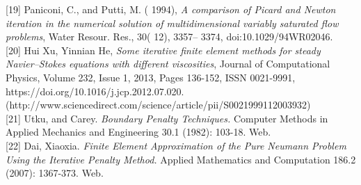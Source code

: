 \documentclass[11pt,twoside,a4paper]{article}
\begin{document}
[19] Paniconi, C., and Putti, M. ( 1994), \textit{A comparison of Picard and Newton iteration in the numerical solution of multidimensional variably saturated flow problems}, Water Resour. Res., 30( 12), 3357– 3374, doi:10.1029/94WR02046.\\

[20] Hui Xu, Yinnian He,
\textit{Some iterative finite element methods for steady Navier–Stokes equations with different viscosities},
Journal of Computational Physics,
Volume 232, Issue 1,
2013,
Pages 136-152,
ISSN 0021-9991,
https://doi.org/10.1016/j.jcp.2012.07.020.
(http://www.sciencedirect.com/science/article/pii/S0021999112003932)\\

[21] Utku, and Carey. \textit{Boundary Penalty Techniques.} Computer Methods in Applied Mechanics and Engineering 30.1 (1982): 103-18. Web. \\

[22] Dai, Xiaoxia. \textit{Finite Element Approximation of the Pure Neumann Problem Using the Iterative Penalty Method.} Applied Mathematics and Computation 186.2 (2007): 1367-373. Web.\\
\end{document}
